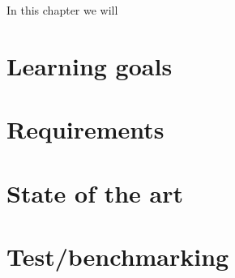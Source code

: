 In this chapter we will 

\section{Learning goals}

\section{Requirements}

\section{State of the art}

\section{Test/benchmarking}

